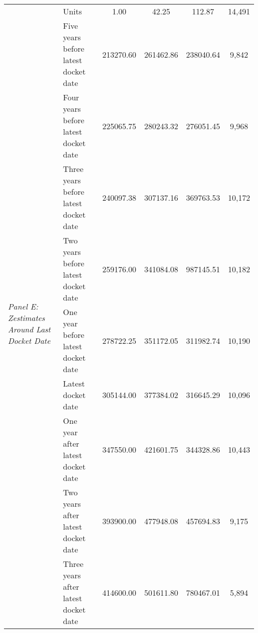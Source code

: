 \begin{tabular}{llcccc}
 & Units & 1.00 & 42.25 & 112.87 & 14,491 \\
\cline{1-6}
\multirow[c]{9}{4cm}{\textit{Panel E: Zestimates Around Last Docket Date}} & Five years before latest docket date & 213270.60 & 261462.86 & 238040.64 & 9,842 \\
 & Four years before latest docket date & 225065.75 & 280243.32 & 276051.45 & 9,968 \\
 & Three years before latest docket date & 240097.38 & 307137.16 & 369763.53 & 10,172 \\
 & Two years before latest docket date & 259176.00 & 341084.08 & 987145.51 & 10,182 \\
 & One year before latest docket date & 278722.25 & 351172.05 & 311982.74 & 10,190 \\
 & Latest docket date & 305144.00 & 377384.02 & 316645.29 & 10,096 \\
 & One year after latest docket date & 347550.00 & 421601.75 & 344328.86 & 10,443 \\
 & Two years after latest docket date & 393900.00 & 477948.08 & 457694.83 & 9,175 \\
 & Three years after latest docket date & 414600.00 & 501611.80 & 780467.01 & 5,894 \\
\cline{1-6}
\bottomrule
\end{tabular}

